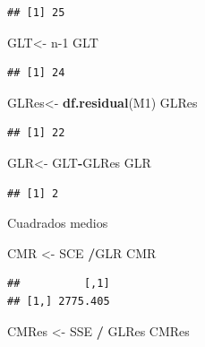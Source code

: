\documentclass[
]{book}
\newenvironment{Shaded}{\begin{snugshade}}{\end{snugshade}}
\newcommand{\DecValTok}[1]{\textcolor[rgb]{0.00,0.00,0.81}{#1}}
\newcommand{\FunctionTok}[1]{\textcolor[rgb]{0.13,0.29,0.53}{\textbf{#1}}}
\newcommand{\NormalTok}[1]{#1}
\newcommand{\OtherTok}[1]{\textcolor[rgb]{0.56,0.35,0.01}{#1}}
\newcommand{\SpecialCharTok}[1]{\textcolor[rgb]{0.81,0.36,0.00}{\textbf{#1}}}
\begin{document}
\begin{verbatim}
## [1] 25
\end{verbatim}

\begin{Shaded}
\begin{Highlighting}[]
\NormalTok{GLT}\OtherTok{\textless{}{-}}\NormalTok{ n}\DecValTok{{-}1}
\NormalTok{GLT}
\end{Highlighting}
\end{Shaded}

\begin{verbatim}
## [1] 24
\end{verbatim}

\begin{Shaded}
\begin{Highlighting}[]
\NormalTok{GLRes}\OtherTok{\textless{}{-}} \FunctionTok{df.residual}\NormalTok{(M1)}
\NormalTok{GLRes}
\end{Highlighting}
\end{Shaded}

\begin{verbatim}
## [1] 22
\end{verbatim}

\begin{Shaded}
\begin{Highlighting}[]
\NormalTok{GLR}\OtherTok{\textless{}{-}}\NormalTok{ GLT}\SpecialCharTok{{-}}\NormalTok{GLRes}
\NormalTok{GLR}
\end{Highlighting}
\end{Shaded}

\begin{verbatim}
## [1] 2
\end{verbatim}

Cuadrados medios

\begin{Shaded}
\begin{Highlighting}[]
\NormalTok{CMR }\OtherTok{\textless{}{-}}\NormalTok{ SCE }\SpecialCharTok{/}\NormalTok{GLR}
\NormalTok{CMR}
\end{Highlighting}
\end{Shaded}

\begin{verbatim}
##          [,1]
## [1,] 2775.405
\end{verbatim}

\begin{Shaded}
\begin{Highlighting}[]
\NormalTok{CMRes }\OtherTok{\textless{}{-}}\NormalTok{ SSE }\SpecialCharTok{/}\NormalTok{ GLRes}
\NormalTok{CMRes}
\end{Highlighting}
\end{Shaded}
\end{document}
